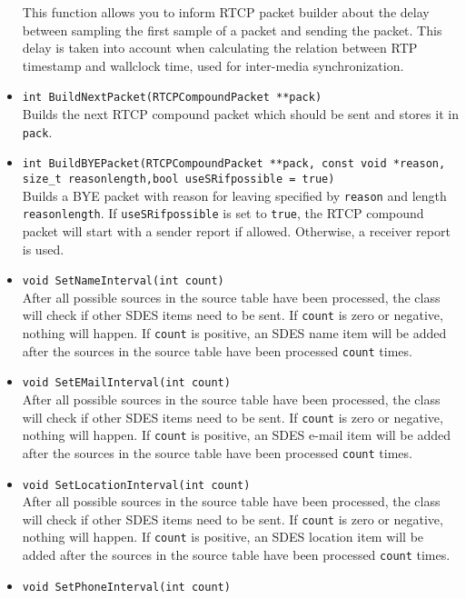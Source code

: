 \documentclass[12pt,a4paper]{article}
\begin{document}
\begin{itemize}
						This function allows you to inform RTCP packet builder about the
						delay between sampling the first sample of a packet and
						sending the packet. This delay is taken into account when
						calculating the relation between RTP timestamp and wallclock
						time, used for inter-media synchronization.
					\item {\tt int BuildNextPacket(RTCPCompoundPacket **pack)}\\
						Builds the next RTCP compound packet which should be
						sent and stores it in {\tt pack}.
					\item {\tt int BuildBYEPacket(RTCPCompoundPacket **pack, const void *reason, size\_t reasonlength,bool useSRifpossible = true)}\\
						Builds a BYE packet with reason for leaving
						specified by {\tt reason} and length
						{\tt reasonlength}. If {\tt useSRifpossible} is set to {\tt true},
						the RTCP compound packet will start with a sender report if
						allowed. Otherwise, a receiver report is used.
					\item {\tt void SetNameInterval(int count)}\\
						After all possible sources in the source table have been
						processed, the class will check if other SDES items
						need to be sent. If {\tt count} is zero or negative, nothing
						will happen. If {\tt count} is positive, an SDES name
						item will be added after the sources in the source table have
						been processed {\tt count} times.
					\item {\tt void SetEMailInterval(int count)}\\
						After all possible sources in the source table have been
						processed, the class will check if other SDES items
						need to be sent. If {\tt count} is zero or negative, nothing
						will happen. If {\tt count} is positive, an SDES e-mail
						item will be added after the sources in the source table have
						been processed {\tt count} times.
					\item {\tt void SetLocationInterval(int count)}\\
						After all possible sources in the source table have been
						processed, the class will check if other SDES items
						need to be sent. If {\tt count} is zero or negative, nothing
						will happen. If {\tt count} is positive, an SDES location
						item will be added after the sources in the source table have
						been processed {\tt count} times.
					\item {\tt void SetPhoneInterval(int count)}\\

\end{itemize}
\end{document}
